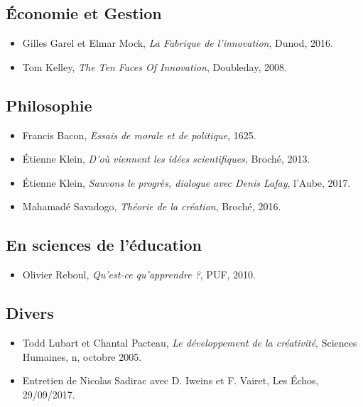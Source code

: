 \documentclass{article}
\begin{document}
\subsection{Économie et Gestion}

\begin{itemize}

\item Gilles Garel et Elmar Mock, \textit{La Fabrique de l'innovation}, Dunod, 2016.
\item Tom Kelley, \textit{The Ten Faces Of Innovation}, Doubleday, 2008.

\end{itemize}

\subsection{Philosophie}

\begin{itemize}

\item Francis Bacon, \textit{Essais de morale et de politique}, 1625.
\item Étienne Klein, \textit{D'où viennent les idées scientifiques}, Broché, 2013.
\item Étienne Klein, \textit{Sauvons le progrès, dialogue avec Denis Lafay}, l’Aube, 2017.
\item Mahamadé Savadogo, \textit{Théorie de la création}, Broché, 2016.	

\end{itemize}

\subsection{En sciences de l’éducation}

\begin{itemize}

\item Olivier Reboul, \textit{Qu'est-ce qu'apprendre ?}, PUF, 2010.

\end{itemize}

\subsection{Divers}

\begin{itemize}

\item Todd Lubart et Chantal Pacteau, \textit{Le développement de la créativité}, Sciences Humaines, n, octobre 2005.
\item Entretien de Nicolas Sadirac avec D. Iweins et F. Vairet, Les Échos, 29/09/2017.

\end{itemize}
\end{document}
